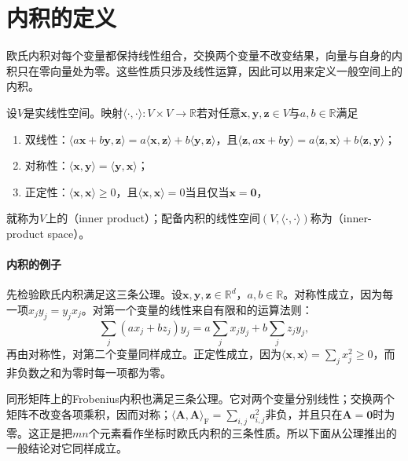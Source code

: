 
\section{内积的定义}
\label{sec:ls-inner-product-axioms}
\label{sec:ls-inner-product-spaces}
\label{sec:ls-inner-product-definition}

欧氏内积对每个变量都保持线性组合，交换两个变量不改变结果，向量与自身的内积只在零向量处为零。这些性质只涉及线性运算，因此可以用来定义一般空间上的内积。
\begin{definition}[内积空间]
\label{def:functional-inner-product-space}
\label{def:linear-algebra-inner-product}
设$V$是实线性空间。映射$\langle\cdot,\cdot\rangle:V\times V\to\mathbb R$若对任意$\bm x,\bm y,\bm z\in V$与$a,b\in\mathbb R$满足
\begin{enumerate}
 \item 双线性：$\langle a\bm x+b\bm y,\bm z\rangle=a\langle\bm x,\bm z\rangle+b\langle\bm y,\bm z\rangle$，且$\langle\bm z,a\bm x+b\bm y\rangle=a\langle\bm z,\bm x\rangle+b\langle\bm z,\bm y\rangle$；
 \item 对称性：$\langle\bm x,\bm y\rangle=\langle\bm y,\bm x\rangle$；
 \item 正定性：$\langle\bm x,\bm x\rangle\geq0$，且$\langle\bm x,\bm x\rangle=0$当且仅当$\bm x=\bm0$，
\end{enumerate}
就称为$V$上的（inner product）；配备内积的线性空间$(V,\langle\cdot,\cdot\rangle)$称为（inner-product space）。
\end{definition}

\paragraph{内积的例子}
先检验欧氏内积满足这三条公理。设$\bm x,\bm y,\bm z\in\mathbb R^d$，$a,b\in\mathbb R$。对称性成立，因为每一项$x_jy_j=y_jx_j$。对第一个变量的线性来自有限和的运算法则：
\[
 \sum_j(ax_j+bz_j)y_j=a\sum_jx_jy_j+b\sum_jz_jy_j,
\]
再由对称性，对第二个变量同样成立。正定性成立，因为$\langle\bm x,\bm x\rangle=\sum_jx_j^2\geq0$，而非负数之和为零时每一项都为零。

同形矩阵上的Frobenius内积也满足三条公理。它对两个变量分别线性；交换两个矩阵不改变各项乘积，因而对称；$\langle\bm A,\bm A\rangle_{\mathrm F}=\sum_{i,j}a_{i,j}^2$非负，并且只在$\bm A=\bm0$时为零。这正是把$mn$个元素看作坐标时欧氏内积的三条性质。所以下面从公理推出的一般结论对它同样成立。

